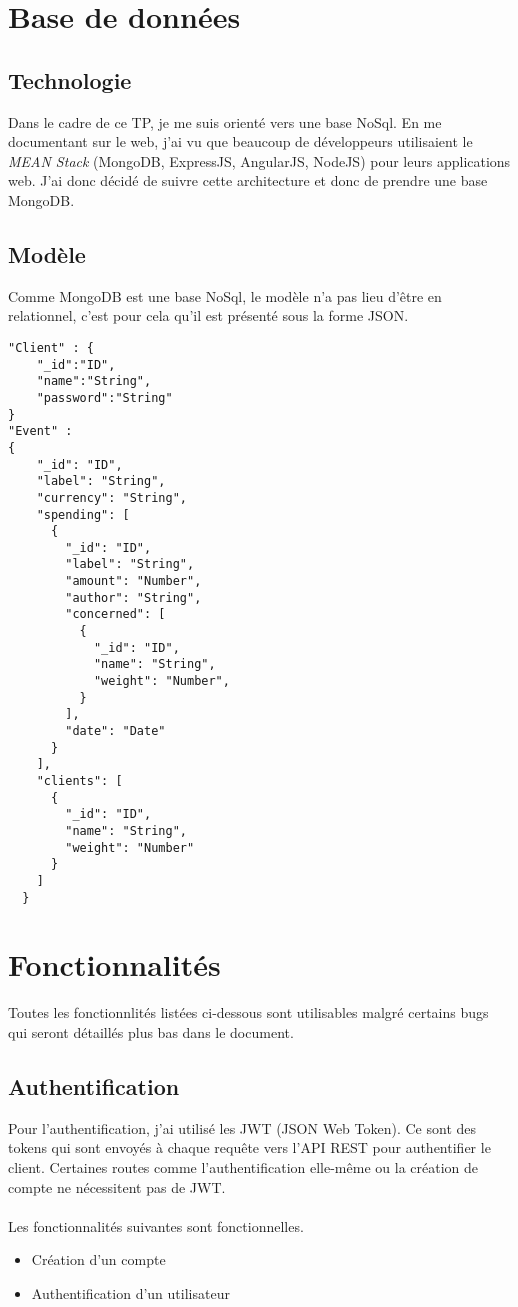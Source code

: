 \documentclass[a4paper]{report}
\begin{document}
\section{Base de données}
\subsection{Technologie}
Dans le cadre de ce TP, je me suis orienté vers une base NoSql.
En me documentant sur le web, j'ai vu que beaucoup de développeurs utilisaient le \textit{MEAN Stack} (MongoDB, ExpressJS, AngularJS, NodeJS) pour leurs applications web.
J'ai donc décidé de suivre cette architecture et donc de prendre une base MongoDB.

\subsection{Modèle}
Comme MongoDB est une base NoSql, le modèle n'a pas lieu d'être en relationnel, c'est pour cela qu'il est présenté sous la forme JSON.
\begin{verbatim}
"Client" : {
    "_id":"ID",
    "name":"String",
    "password":"String"
}
"Event" :
{
    "_id": "ID",
    "label": "String",
    "currency": "String",
    "spending": [
      {
        "_id": "ID",
        "label": "String",
        "amount": "Number",
        "author": "String",
        "concerned": [
          {
            "_id": "ID",
            "name": "String",
            "weight": "Number",
          }
        ],
        "date": "Date"
      }
    ],
    "clients": [
      {
        "_id": "ID",
        "name": "String",
        "weight": "Number"
      }
    ]
  }
\end{verbatim}

\section{Fonctionnalités}
Toutes les fonctionnlités listées ci-dessous sont utilisables malgré certains bugs qui seront détaillés plus bas dans le document.
\subsection{Authentification}
Pour l'authentification, j'ai utilisé les JWT (JSON Web Token). Ce sont des tokens qui sont envoyés à chaque requête vers l'API REST pour authentifier le client.
Certaines routes comme l'authentification elle-même ou la création de compte ne nécessitent pas de JWT.\\\\
Les fonctionnalités suivantes sont fonctionnelles.
\begin{itemize}
\item Création d'un compte
\item Authentification d'un utilisateur
\end{itemize}
\end{document}
